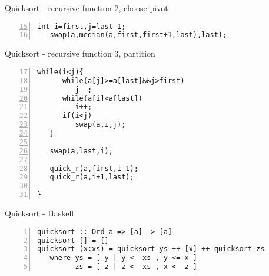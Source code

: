 \documentclass{beamer}
\begin{document}
\begin{frame}[fragile]{Quicksort - recursive function 2, choose pivot}
\begin{lstlisting}[numbers=left,firstnumber=15]
   int i=first,j=last-1;
   swap(a,median(a,first,first+1,last),last);
\end{lstlisting}
\end{frame}
\begin{frame}[fragile]{Quicksort - recursive function 3, partition}
\begin{lstlisting}[numbers=left,firstnumber=17]
   while(i<j){
      while(a[j]>=a[last]&&j>first)
         j--;
      while(a[i]<a[last])
         i++;
      if(i<j)
         swap(a,i,j);
   }

   swap(a,last,i);

   quick_r(a,first,i-1);
   quick_r(a,i+1,last);

}
\end{lstlisting}
\end{frame}

\begin{frame}[fragile]{Quicksort - Haskell}
\begin{lstlisting}[numbers=left,firstnumber=1]
quicksort :: Ord a => [a] -> [a]
quicksort [] = []
quicksort (x:xs) = quicksort ys ++ [x] ++ quicksort zs
   where ys = [ y | y <- xs , y <= x ]
         zs = [ z | z <- xs , x <  z ]
\end{lstlisting}
\end{frame}
\end{document}
